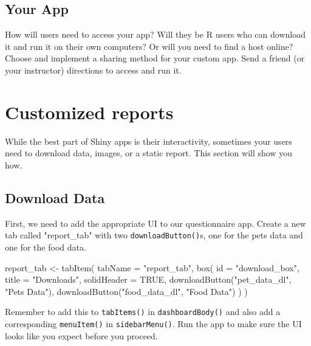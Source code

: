 \documentclass[
  oneside]{book}
\newenvironment{Shaded}{\begin{snugshade}}{\end{snugshade}}
\newcommand{\AttributeTok}[1]{\textcolor[rgb]{0.77,0.63,0.00}{#1}}
\newcommand{\ConstantTok}[1]{\textcolor[rgb]{0.00,0.00,0.00}{#1}}
\newcommand{\FunctionTok}[1]{\textcolor[rgb]{0.00,0.00,0.00}{#1}}
\newcommand{\NormalTok}[1]{#1}
\newcommand{\OtherTok}[1]{\textcolor[rgb]{0.56,0.35,0.01}{#1}}
\newcommand{\StringTok}[1]{\textcolor[rgb]{0.31,0.60,0.02}{#1}}
\begin{document}
\hypertarget{your-app-sharing}{%
\section{Your App}\label{your-app-sharing}}

How will users need to access your app? Will they be R users who can download it and run it on their own computers? Or will you need to find a host online? Choose and implement a sharing method for your custom app. Send a friend (or your instructor) directions to access and run it.

\hypertarget{reports}{%
\chapter{Customized reports}\label{reports}}

While the best part of Shiny apps is their interactivity, sometimes your users need to download data, images, or a static report. This section will show you how.

\hypertarget{download-data}{%
\section{Download Data}\label{download-data}}

First, we need to add the appropriate UI to our questionnaire app. Create a new tab called \StringTok{"report\_tab"} with two \texttt{downloadButton}\texttt{()}s, one for the pets data and one for the food data.

\begin{Shaded}
\begin{Highlighting}[]
\NormalTok{report\_tab }\OtherTok{\textless{}{-}} \FunctionTok{tabItem}\NormalTok{(}
  \AttributeTok{tabName =} \StringTok{"report\_tab"}\NormalTok{,}
  \FunctionTok{box}\NormalTok{(}
    \AttributeTok{id =} \StringTok{"download\_box"}\NormalTok{,}
    \AttributeTok{title =} \StringTok{"Downloads"}\NormalTok{,}
    \AttributeTok{solidHeader =} \ConstantTok{TRUE}\NormalTok{,}
    \FunctionTok{downloadButton}\NormalTok{(}\StringTok{"pet\_data\_dl"}\NormalTok{, }\StringTok{"Pets Data"}\NormalTok{),}
    \FunctionTok{downloadButton}\NormalTok{(}\StringTok{"food\_data\_dl"}\NormalTok{, }\StringTok{"Food Data"}\NormalTok{)}
\NormalTok{  )}
\NormalTok{)}
\end{Highlighting}
\end{Shaded}

\begin{warning}
Remember to add this to \texttt{tabItems}\texttt{()} in \texttt{dashboardBody}\texttt{()} and also add a corresponding \texttt{menuItem}\texttt{()} in \texttt{sidebarMenu}\texttt{()}. Run the app to make sure the UI looks like you expect before you proceed.

\end{warning}
\end{document}
